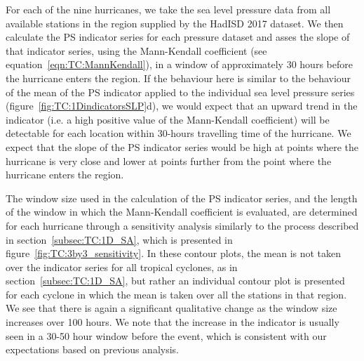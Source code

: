 For each of the nine hurricanes, we take the sea level pressure data from all available stations in the region supplied by the HadISD 2017 dataset. We then calculate the PS indicator series for each pressure dataset and asses the slope of that indicator series, using the Mann-Kendall coefficient (see equation~\ref{eqn:TC:MannKendall}), in a window of approximately 30 hours before the hurricane enters the region. If the behaviour here is similar to the behaviour of the mean of the PS indicator applied to the individual sea level pressure series (figure~\ref{fig:TC:1DindicatorsSLP}d), we would expect that an upward trend in the indicator (i.e. a high positive value of the Mann-Kendall coefficient) will be detectable for each location within 30-hours travelling time of the hurricane. We expect that the slope of the PS indicator series would be high at points where the hurricane is very close and lower at points further from the point where the hurricane enters the region. 

The window size used in the calculation of the PS indicator series, and the length of the window in which the Mann-Kendall coefficient is evaluated, are determined for each hurricane through a sensitivity analysis similarly to the process described in section~\ref{subsec:TC:1D_SA}, which is presented in figure~\ref{fig:TC:3by3_sensitivity}. In these contour plots, the mean is not taken over the indicator series for all tropical cyclones, as in section~\ref{subsec:TC:1D_SA}, but rather an individual contour plot is presented for each cyclone in which the mean is taken over all the stations in that region. We see that there is again a significant qualitative change as the window size increases over 100 hours. We note that the increase in the indicator is usually seen in a 30-50 hour window before the event, which is consistent with our expectations based on previous analysis.


